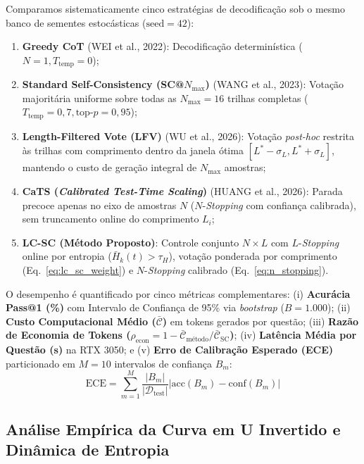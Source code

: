 \documentclass[9pt,conference]{IEEEtran}
\begin{document}
Comparamos sistematicamente cinco estrat\'{e}gias de decodifica\c{c}\~{a}o sob o mesmo banco de sementes estoc\'{a}sticas ($\text{seed} = 42$):
\begin{enumerate}
    \item \textbf{Greedy CoT} (WEI et al., 2022): Decodifica\c{c}\~{a}o determin\'{i}stica ($N=1, T_{\text{temp}}=0$);
    \item \textbf{Standard Self-Consistency (SC@$N_{\max}$)} (WANG et al., 2023): Vota\c{c}\~{a}o majorit\'{a}ria uniforme sobre todas as $N_{\max}=16$ trilhas completas ($T_{\text{temp}}=0,7, \text{top-}p=0,95$);
    \item \textbf{Length-Filtered Vote (LFV)} (WU et al., 2026): Vota\c{c}\~{a}o \textit{post-hoc} restrita \`{a}s trilhas com comprimento dentro da janela \'{o}tima $[L^* - \sigma_L, L^* + \sigma_L]$, mantendo o custo de gera\c{c}\~{a}o integral de $N_{\max}$ amostras;
    \item \textbf{CaTS (\textit{Calibrated Test-Time Scaling})} (HUANG et al., 2026): Parada precoce apenas no eixo de amostras $N$ ($N$-\textit{Stopping} com confian\c{c}a calibrada), sem truncamento online do comprimento $L_i$;
    \item \textbf{LC-SC (M\'{e}todo Proposto)}: Controle conjunto $N \times L$ com $L$-\textit{Stopping} online por entropia ($\bar{H}_k(t) > \tau_H$), vota\c{c}\~{a}o ponderada por comprimento (Eq.~\ref{eq:lc_sc_weight}) e $N$-\textit{Stopping} calibrado (Eq.~\ref{eq:n_stopping}).
\end{enumerate}

O desempenho \'{e} quantificado por cinco m\'{e}tricas complementares: (i) \textbf{Acur\'{a}cia Pass@1 (\%)} com Intervalo de Confian\c{c}a de 95\% via \textit{bootstrap} ($B=1.000$); (ii) \textbf{Custo Computacional M\'{e}dio ($\bar{\mathcal{C}}$)} em tokens gerados por quest\~{a}o; (iii) \textbf{Raz\~{a}o de Economia de Tokens ($\rho_{\text{econ}} = 1 - \bar{\mathcal{C}}_{\text{m\'{e}todo}}/\bar{\mathcal{C}}_{\text{SC}}$)}; (iv) \textbf{Lat\^{e}ncia M\'{e}dia por Quest\~{a}o (s)} na RTX 3050; e (v) \textbf{Erro de Calibra\c{c}\~{a}o Esperado (ECE)} particionado em $M=10$ intervalos de confian\c{c}a $B_m$:
\begin{equation}
\text{ECE} = \sum_{m=1}^{M} \frac{|B_m|}{|\mathcal{D}_{\text{test}}|} \left| \text{acc}(B_m) - \text{conf}(B_m) \right|
\label{eq:ece_metric}
\end{equation}

\subsection{An\'{a}lise Emp\'{i}rica da Curva em U Invertido e Din\^{a}mica de Entropia}
\end{document}
